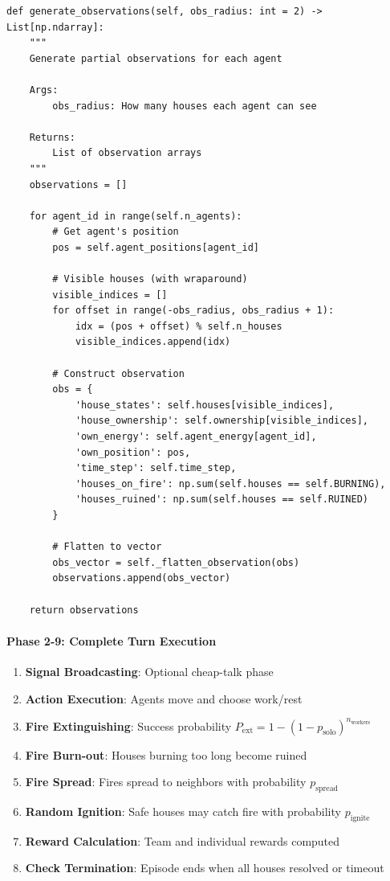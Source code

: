 \documentclass[10pt, letterpaper]{article}
\begin{document}
\begin{lstlisting}
def generate_observations(self, obs_radius: int = 2) -> List[np.ndarray]:
    """
    Generate partial observations for each agent

    Args:
        obs_radius: How many houses each agent can see

    Returns:
        List of observation arrays
    """
    observations = []

    for agent_id in range(self.n_agents):
        # Get agent's position
        pos = self.agent_positions[agent_id]

        # Visible houses (with wraparound)
        visible_indices = []
        for offset in range(-obs_radius, obs_radius + 1):
            idx = (pos + offset) % self.n_houses
            visible_indices.append(idx)

        # Construct observation
        obs = {
            'house_states': self.houses[visible_indices],
            'house_ownership': self.ownership[visible_indices],
            'own_energy': self.agent_energy[agent_id],
            'own_position': pos,
            'time_step': self.time_step,
            'houses_on_fire': np.sum(self.houses == self.BURNING),
            'houses_ruined': np.sum(self.houses == self.RUINED)
        }

        # Flatten to vector
        obs_vector = self._flatten_observation(obs)
        observations.append(obs_vector)

    return observations
\end{lstlisting}

\paragraph{Phase 2-9: Complete Turn Execution}
\begin{enumerate}
    \item \textbf{Signal Broadcasting}: Optional cheap-talk phase
    \item \textbf{Action Execution}: Agents move and choose work/rest
    \item \textbf{Fire Extinguishing}: Success probability $P_{\text{ext}} = 1 - (1 - p_{\text{solo}})^{n_{\text{workers}}}$
    \item \textbf{Fire Burn-out}: Houses burning too long become ruined
    \item \textbf{Fire Spread}: Fires spread to neighbors with probability $p_{\text{spread}}$
    \item \textbf{Random Ignition}: Safe houses may catch fire with probability $p_{\text{ignite}}$
    \item \textbf{Reward Calculation}: Team and individual rewards computed
    \item \textbf{Check Termination}: Episode ends when all houses resolved or timeout
\end{enumerate}
\end{document}
